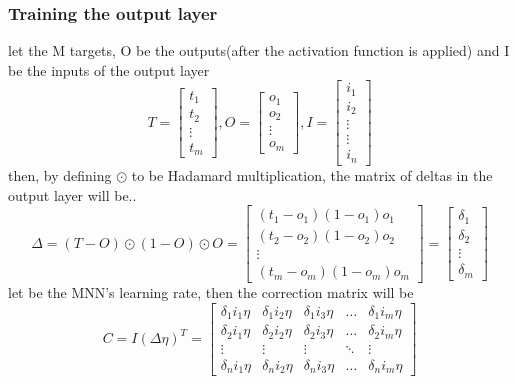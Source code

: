 \documentclass{proc}
\begin{document}
	 \subsubsection{Training the output layer}
	 let the M targets, O be the outputs(after the activation function is applied) and I be the inputs of the output layer
	 \[
	 T=
	 \begin{bmatrix}
	 t_{1}\\
	 t_{2}\\
	 \vdots\\
	 t_{m}
	 \end{bmatrix}, 	 
	 O=
	 \begin{bmatrix}
	 o_{1}\\
	 o_{2}\\
	 \vdots\\
	 o_{m}
	 \end{bmatrix},
	 I=
	 \begin{bmatrix}
	 i_{1}\\
	 i_{2}\\
	 \vdots\\
	 \vdots\\
	 i_{n}
	 \end{bmatrix}    
	 \]
	 then, by defining ${\odot}$ to be Hadamard multiplication, the matrix of deltas in the output layer will be..
	 \[
	 \Delta=
	 (T-O)\odot(1-O)\odot O=
	 \begin{bmatrix}
	 (t_{1} - o_{1})(1-o_{1})o_{1}\\
	 (t_{2} - o_{2})(1-o_{2})o_{2}\\
	  \vdots\\
	 (t_{m} - o_{m})(1-o_{m})o_{m}
	  \end{bmatrix} 
	 =
	 \begin{bmatrix}
	 \delta_1\\
	 \delta_2\\
	 \vdots\\
	 \delta_m
	 \end{bmatrix} 
	 \]
	let \texteta{} be the MNN's learning rate, then the correction matrix will be
	\[
	C=I(\Delta\eta)^T= 
	\begin{bmatrix}
		\delta_1i_1\eta & \delta_1i_2\eta & \delta_1i_3\eta & \dots  & \delta_1i_m\eta \\
		\delta_2i_1\eta & \delta_2i_2\eta & \delta_2i_3\eta & \dots  &  \delta_2i_m\eta \\
		\vdots & \vdots & \vdots & \ddots & \vdots \\
		\delta_ni_1\eta & \delta_ni_2\eta & \delta_ni_3\eta & \dots  & \delta_ni_m\eta
	\end{bmatrix}
	\]
\end{document}
